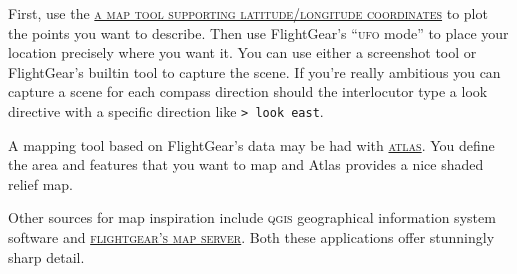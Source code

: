 First, use the \href{https://www.maps.ie/coordinates.html}{\textsc{a map tool supporting latitude/longitude coordinates}} to plot the points you want to
describe. Then use FlightGear's ``\textsc{ufo} mode'' to place your location precisely where you want
it. You can use either a screenshot tool or FlightGear's built\textendash in
tool to capture the scene. If you're really ambitious you can capture a scene
for each compass direction should the interlocutor type a look directive with a
specific direction like \texttt{\small{>\,look east}}.

A mapping tool based on FlightGear's data may be had with
\href{http://wiki.flightgear.org/Atlas}{\textsc{atlas}}. You define the area
and features that you want to map and Atlas provides a nice shaded relief map. 

Other sources for map inspiration include \textsc{qgis} geographical information
system software and \href{http://mpmap02.flightgear.org/}{\textsc{flightgear's map server}}. Both these applications
offer stunningly sharp detail.
